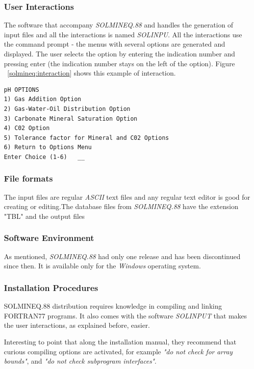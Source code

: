 \documentclass[ppgc,mestrado,english]{iiufrgs}
\begin{document}
\subsubsection{User Interactions}
The software that accompany \emph{SOLMINEQ.88} and handles the generation of input files and all the interactions is named \emph{SOLINPU}. All the interactions use the command prompt - the menus with several options are generated and displayed. The user selects the option by entering the indication number and pressing enter (the indication number stays on the left of the option). Figure ~\ref{solmineq:interaction} shows this example of interaction.

\begin{minipage}[c]{0.95\textwidth}
\begin{lstlisting}[frame=single, caption=\emph{SOLMINEQ.88}'s example of user interaction, label=solmineq:interaction]
	pH OPTIONS
1) Gas Addition Option
2) Gas-Water-Oil Distribution Option
3) Carbonate Mineral Saturation Option
4) C02 Option
5) Tolerance factor for Mineral and C02 Options
6) Return to Options Menu
Enter Choice (1-6)   __
\end{lstlisting}
\end{minipage}

\subsubsection{File formats}
The input files are regular \emph{ASCII} text files and any regular text editor is good for creating or editing.The database files from \emph{SOLMINEQ.88} have the extension "TBL" and the output files 

\subsubsection{Software Environment}
As mentioned, \emph{SOLMINEQ.88} had only one release and has been discontinued since then. It is available only for the \emph{Windows} operating system.

\subsubsection{Installation Procedures}
SOLMINEQ.88 distribution requires knowledge in compiling and linking FORTRAN77 programs. It also comes with the software \emph{SOLINPUT} that makes the user interactions, as explained before, easier.

Interesting to point that along the installation manual, they recommend  that curious compiling options are activated, for example \emph{"do not check for array bounds"}, and \emph{"do not check subprogram interfaces"}.
\end{document}
